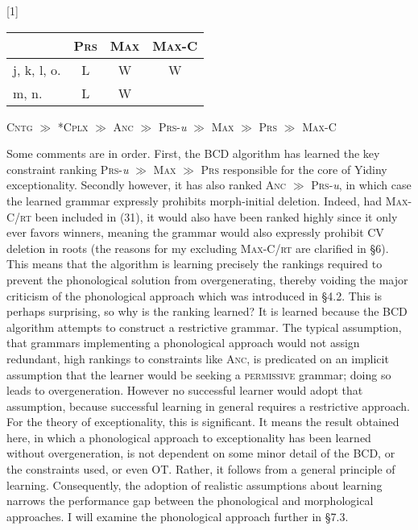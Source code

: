 \documentclass[output=paper,
modfonts
]{LSP/langsci}
\begin{document}
\ea 
\renewcommand*\arraystretch{1.2}
\scalebox{1}[1]{\begin{tabular}[t]{|l||c||c|c|}
\firsthline & \textsc{Prs} & \textsc{Max} & \textsc{Max-C} \\
\hline
\hline j, k, l, o. & L & W & W \\
\hline m, n. & L & W & \\
\hline \end{tabular}} \renewcommand*\arraystretch{1}
\z

\ea
\textsc{Cntg} \textsc{${\gg}$}\textsc{} \textsc{*Cplx} \textsc{${\gg}$} \textsc{Anc} \textsc{${\gg}$}\textsc{} \textsc{Prs}{}-\textit{u} ${\gg}$ \textsc{Max} \textsc{${\gg}$}\textsc{} \textsc{Prs} \textsc{${\gg}$} \textsc{Max-C}
\z

Some comments are in order. First, the BCD algorithm has learned the key constraint ranking \textsc{Prs}{}-\textit{u} ${\gg}$ \textsc{Max} \textsc{${\gg}$}\textsc{} \textsc{Prs} responsible for the core of Yidiny exceptionality. Secondly however, it has also ranked \textsc{Anc} \textsc{${\gg}$} \textsc{Prs}{}-\textit{u}, in which case the learned grammar expressly prohibits morph-initial deletion. Indeed, had \textsc{Max-C/rt} been included in (31), it would also have been ranked highly since it only ever favors winners, meaning the grammar would also expressly prohibit CV deletion in roots (the reasons for my excluding \textsc{Max-C/rt} are clarified in §6). This means that the algorithm is learning precisely the rankings required to prevent the phonological solution from overgenerating, thereby voiding the major criticism of the phonological approach which was introduced in §4.2. This is perhaps surprising, so why is the ranking learned? It is learned because the BCD algorithm attempts to construct a restrictive grammar. The typical assumption, that grammars implementing a phonological approach would not assign redundant, high rankings to constraints like \textsc{Anc}, is predicated on an implicit assumption that the learner would be seeking a \textsc{permissive} grammar; doing so leads to overgeneration. However no successful learner would adopt that assumption, because successful learning in general requires a restrictive approach. For the theory of exceptionality, this is significant. It means the result obtained here, in which a phonological approach to exceptionality has been learned without overgeneration, is not dependent on some minor detail of the BCD, or the constraints used, or even OT. Rather, it follows from a general principle of learning. Consequently, the adoption of realistic assumptions about learning narrows the performance gap between the phonological and morphological approaches. I will examine the phonological approach further in §7.3.
\end{document}
